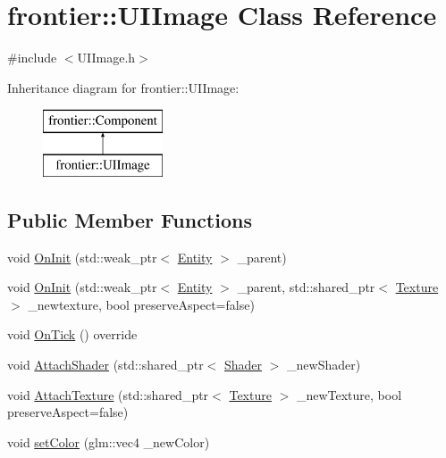 \hypertarget{classfrontier_1_1_u_i_image}{}\section{frontier\+:\+:U\+I\+Image Class Reference}
\label{classfrontier_1_1_u_i_image}


{\ttfamily \#include $<$U\+I\+Image.\+h$>$}

Inheritance diagram for frontier\+:\+:U\+I\+Image\+:\begin{figure}[H]
\begin{center}
\leavevmode
\includegraphics[height=2.000000cm]{classfrontier_1_1_u_i_image}
\end{center}
\end{figure}
\subsection*{Public Member Functions}
\begin{DoxyCompactItemize}
\item 
void \hyperlink{classfrontier_1_1_u_i_image_ad862e7dd5bcd1c2847001f5e1b56c114}{On\+Init} (std\+::weak\+\_\+ptr$<$ \hyperlink{classfrontier_1_1_entity}{Entity} $>$ \+\_\+parent)
\item 
void \hyperlink{classfrontier_1_1_u_i_image_a77205b7ee247e0ee36523e07816e10fb}{On\+Init} (std\+::weak\+\_\+ptr$<$ \hyperlink{classfrontier_1_1_entity}{Entity} $>$ \+\_\+parent, std\+::shared\+\_\+ptr$<$ \hyperlink{classfrontier_1_1_texture}{Texture} $>$ \+\_\+newtexture, bool preserve\+Aspect=false)
\item 
void \hyperlink{classfrontier_1_1_u_i_image_a4e0d055c0add55fa5e63ae892ea59498}{On\+Tick} () override
\item 
void \hyperlink{classfrontier_1_1_u_i_image_a6e734a2bc1ab3869dbed9ad0161db03e}{Attach\+Shader} (std\+::shared\+\_\+ptr$<$ \hyperlink{classfrontier_1_1_shader}{Shader} $>$ \+\_\+new\+Shader)
\item 
void \hyperlink{classfrontier_1_1_u_i_image_a879dd9d55976fb926273c4f426ab84c7}{Attach\+Texture} (std\+::shared\+\_\+ptr$<$ \hyperlink{classfrontier_1_1_texture}{Texture} $>$ \+\_\+new\+Texture, bool preserve\+Aspect=false)
\item 
void \hyperlink{classfrontier_1_1_u_i_image_ab5b455c9e918f3d2c471b18603973506}{set\+Color} (glm\+::vec4 \+\_\+new\+Color)
\end{DoxyCompactItemize}
